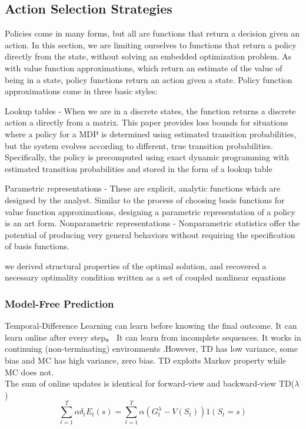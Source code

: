 \documentclass[letterpaper, 10pt, conference]{IEEEtran} %
\begin{document}
\subsection{Action Selection Strategies}


Policies come in many forms, but all are functions that return a decision given an action. In this section, we are limiting ourselves to functions that return a policy directly from
the state, without solving an embedded optimization problem. As with value function approximations, which return an estimate of the value of being in a state, policy functions return an action given a state. Policy function approximations come in three basic styles:

Lookup tables - When we are in a discrete states, the function returns a discrete action a directly from a matrix.
This paper provides loss bounds for situations where a policy for a MDP is determined using estimated transition probabilities, but the system evolves according to different, true transition probabilities. Specifically, the policy is precomputed using exact dynamic programming with estimated transition probabilities and stored in the form of a lookup table


Parametric representations - These are explicit, analytic functions which are designed by the analyst. Similar to the process of choosing basis functions for value function approximations, designing a parametric representation of a policy is an art form. Nonparametric representations - Nonparametric statistics offer the potential of producing very general behaviors without requiring the specification of basis functions.

we derived structural properties of the optimal solution, and recovered a necessary optimality
condition written as a set of coupled nonlinear equations

\subsubsection{Model-Free Prediction}

Temporal-Difference Learning can learn before knowing the final outcome. It can learn online after every step。 It can learn from incomplete sequences. It works in continuing (non-terminating) environments .However, TD has low variance, some bias and MC has high variance, zero bias. TD exploits Markov property while MC does not.\\
The sum of online updates is identical for forward-view and backward-view TD($\lambda$) \cite{liu2015}
\begin{equation}
	\sum_{t=1}^{T}\alpha \delta_tE_t(s) = \sum_{t=1}^{T}\alpha (G_t^\lambda-V(S_t))1(S_t=s)
\end{equation}
\end{document}
